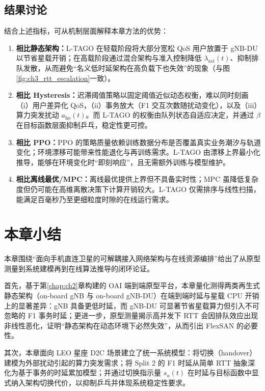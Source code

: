 \documentclass[type=master]{fduthesis}
\begin{document}
\subsection{结果讨论}
\label{subsec:ch3_discussion}

结合上述指标，可从机制层面解释本章方法的优势：
\begin{enumerate}
  \item \textbf{相比静态架构：}L-TAGO 在轻载阶段将大部分宽松 QoS 用户放置于 gNB-DU 以节省星载开销；在高载阶段通过混合架构与准入控制降低 $\lambda_{\mathrm{sat}}(t)$、抑制排队发散，从而避免“名义低时延架构在高负载下也失效”的现象（与图\ref{fig:ch3_rtt_escalation}一致）。
  \item \textbf{相比 Hysteresis：}迟滞阈值策略以固定阈值近似动态权衡，难以同时刻画（i）用户差异化 QoS，（ii）事务放大（F1 交互次数随扰动变化），以及（iii）算力突发扰动 $a_{\mathrm{ho}}(t)$。而 L-TAGO 的权衡由队列状态自适应决定，并通过 $\beta$ 在目标函数层面抑制乒乓，稳定性更可控。
  \item \textbf{相比 PPO：}PPO 的策略质量依赖训练数据分布是否覆盖真实业务潮汐与轨道变化；环境漂移可能带来性能退化与再训练需求。L-TAGO 由漂移上界最小化推导，能够在环境变化时“即刻响应”，且无需额外训练与模型维护。
  \item \textbf{相比离线最优/MPC：}离线最优提供上界但不具备实时性；MPC 虽降低复杂度但仍可能在高维离散决策下计算开销较大。L-TAGO 仅需排序与线性扫描，能满足百毫秒乃至更细粒度时隙的在线运行需求。
\end{enumerate}

\section{本章小结}
\label{sec:ch3_summary}

本章围绕“面向手机直连卫星的可解耦接入网络架构与在线资源编排”给出了从原型测量到系统建模再到在线算法推导的闭环论证。

首先，基于第\ref{chap:ch2}章构建的 OAI 端到端原型平台，本章量化测得两类再生式静态架构（on-board gNB 与 on-board gNB-DU）在端到端时延与星载 CPU 开销上的显著差异：gNB 具备更低时延，而 gNB-DU 可显著节省星载算力但引入不可忽略的 F1 事务时延；更进一步，原型测量揭示高并发下 RTT 会因排队效应出现非线性恶化，证明“静态架构在动态环境下必然失效”，从而引出 FlexSAN 的必要性。

其次，本章面向 LEO 星座 D2C 场景建立了统一系统模型：将切换（handover）建模为外部扰动引起的算力突发需求；将 Split 2 的 F1 时延从简单 RTT 抽象深化为基于事务的时延累加模型；并通过切换指示量 $s_u(t)$ 在时延与目标函数中显式纳入架构切换代价，以抑制乒乓并体现系统稳定性要求。
\end{document}
